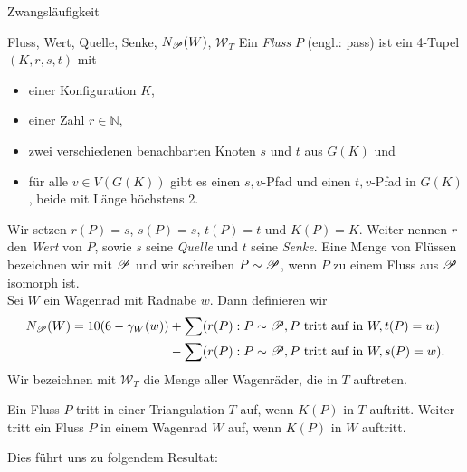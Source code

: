 \begin{section}{Zwangsläufigkeit}
 \begin{definition}{Fluss, Wert, Quelle, Senke, $N_{\mathscr{P}}(W)$, $\mathscr{W}_T$}
  Ein \textit{Fluss} $P$ (engl.: pass) ist ein 4-Tupel $(K,r,s,t)$ mit
  \begin{itemize}
   \item einer Konfiguration $K$,
   \item einer Zahl $r \in \mathbb{N}$,
   \item zwei verschiedenen benachbarten Knoten $s$ und $t$ aus $G(K)$ und
   \item für alle $v \in V(G(K))$ gibt es einen $s,v$-Pfad und einen $t,v$-Pfad in $G(K)$, beide mit Länge höchstens 2.
  \end{itemize}
  Wir setzen $r(P) = s$, $s(P) = s$, $t(P) = t$ und $K(P) = K$. Weiter nennen $r$ den \textit{Wert} von $P$, sowie $s$ seine \textit{Quelle} und $t$ seine \textit{Senke}. Eine Menge von Flüssen bezeichnen wir mit $\mathscr{P}$ und wir schreiben $P \sim \mathscr{P}$, wenn $P$ zu einem Fluss aus $\mathscr{P}$ isomorph ist. \\
  Sei $W$ ein Wagenrad mit Radnabe $w$. Dann definieren wir\\
  \begin{align*}
     N_{\mathscr{P}}(W) = 10(6-\gamma_W(w)) &+ \sum (r(P) : P \sim \mathscr{P}, P \text{ tritt auf in } W, t(P)=w)\\
				   &- \sum (r(P) : P \sim \mathscr{P}, P \text{ tritt auf in } W, s(P)=w)\text{.}
  \end{align*}
  Wir bezeichnen mit $\mathscr{W}_T$ die Menge aller Wagenräder, die in $T$ auftreten. 
 \end{definition}
 
  
 Ein Fluss $P$ tritt in einer Triangulation $T$ auf, wenn $K(P)$ in $T$ auftritt. Weiter tritt ein Fluss $P$ in einem Wagenrad $W$ auf, wenn $K(P)$ in $W$ auftritt.
 
 Dies führt uns zu folgendem Resultat:
 

\end{section}
